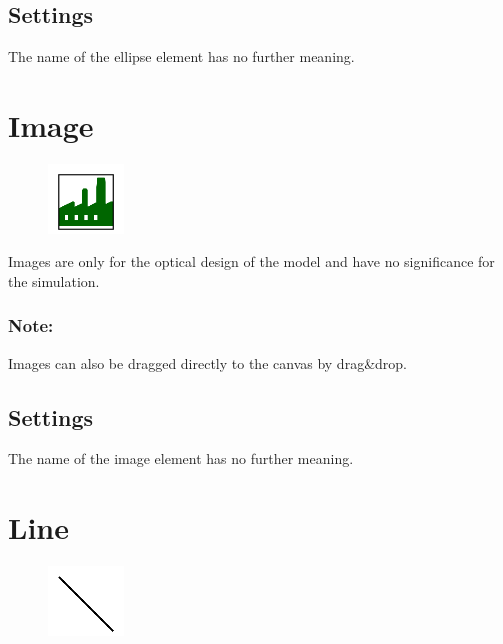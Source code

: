 \subsection*{Settings}

The name of the ellipse element has no further meaning.


\section{Image}
\label{ref:ModelElementImage}

\begin{figure}
\vspace{-22pt}
\includegraphics[width=2cm]{imageModelElementImage.png}
\vspace{-22pt}
\end{figure}

Images are only for the optical design of the model and have no significance for the simulation.

\subsubsection*{Note:}

Images can also be dragged directly to the canvas by drag\&drop.

\subsection*{Settings}

The name of the image element has no further meaning.


\section{Line}
\label{ref:ModelElementLine}

\begin{figure}
\vspace{-22pt}
\includegraphics[width=2cm]{imageModelElementLine.png}
\vspace{-22pt}
\end{figure}

